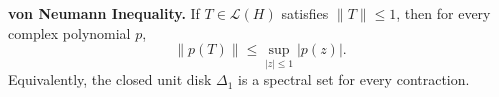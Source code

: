 \textbf{von Neumann Inequality.} If $T \in \mathcal{L}(H)$ satisfies $\|T\| \leq 1$, then for every complex polynomial $p$,
$$\|p(T)\| \leq \sup_{|z| \leq 1} |p(z)|.$$
Equivalently, the closed unit disk $\Delta_1$ is a spectral set for every contraction.
